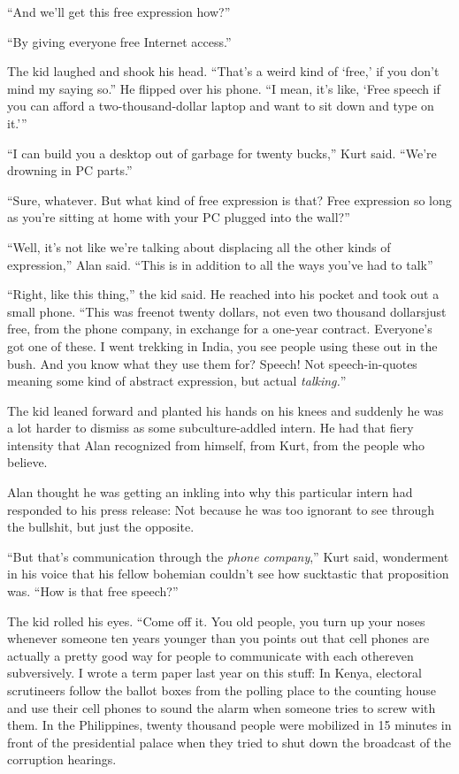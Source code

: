 ``And we'll get this free expression how?''

``By giving everyone free Internet access.''

The kid laughed and shook his head.  ``That's a weird kind of `free,'
if you don't mind my saying so.'' He flipped over his phone.  ``I
mean, it's like, `Free speech if you can afford a two-thousand-dollar
laptop and want to sit down and type on it.'''

``I can build you a desktop out of garbage for twenty bucks,'' Kurt
said.  ``We're drowning in PC parts.''

``Sure, whatever.  But what kind of free expression is that?  Free
expression so long as you're sitting at home with your PC plugged into
the wall?''

``Well, it's not like we're talking about displacing all the other
kinds of expression,'' Alan said.  ``This is in addition to all the
ways you've had to talk\dash{}''

``Right, like this thing,'' the kid said.  He reached into his pocket
and took out a small phone.  ``This was free\dash{}not twenty dollars, not
even two thousand dollars\dash{}just free, from the phone company, in
exchange for a one-year contract.  Everyone's got one of these.  I
went trekking in India, you see people using these out in the bush. 
And you know what they use them for?  Speech!  Not speech-in-quotes
meaning some kind of abstract expression, but actual
\textit{talking.}''

The kid leaned forward and planted his hands on his knees and suddenly
he was a lot harder to dismiss as some subculture-addled intern.  He
had that fiery intensity that Alan recognized from himself, from Kurt,
from the people who believe.

Alan thought he was getting an inkling into why this particular intern
had responded to his press release:  Not because he was too ignorant
to see through the bullshit, but just the opposite.

``But that's communication through the \textit{phone company},'' Kurt
said, wonderment in his voice that his fellow bohemian couldn't see
how sucktastic that proposition was.  ``How is that free speech?''

The kid rolled his eyes.  ``Come off it.  You old people, you turn up
your noses whenever someone ten years younger than you points out that
cell phones are actually a pretty good way for people to communicate
with each other\dash{}even subversively.  I wrote a term paper last year
on this stuff:  In Kenya, electoral scrutineers follow the ballot
boxes from the polling place to the counting house and use their cell
phones to sound the alarm when someone tries to screw with them.  In
the Philippines, twenty thousand people were mobilized in 15 minutes
in front of the presidential palace when they tried to shut down the
broadcast of the corruption hearings.

